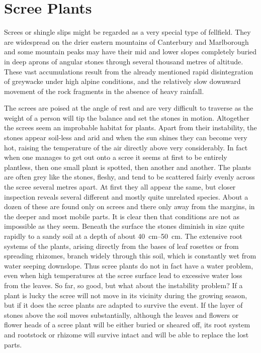 \section{Scree Plants}

Screes or shingle slips might be regarded as a very special type of fellfield.
They are widespread on the drier eastern mountains of Canterbury and Marlborough and some mountain peaks may have their mid and lower slopes completely buried in deep aprons of angular stones through several thousand metres of altitude.
These vast accumulations result from the already mentioned rapid disintegration of greywacke under high alpine conditions, and the relatively slow downward movement of the rock fragments in the absence of heavy rainfall.

The screes are poised at the angle of rest and are very difficult to traverse as the weight of a person will tip the balance and set the stones in motion.
Altogether the screes seem an improbable habitat for plants.
Apart from their instability, the stones appear soil-less and arid and when the sun shines they can become very hot, raising the temperature of the air directly above very considerably.
In fact when one manages to get out onto a scree it seems at first to be entirely plantless, then one small plant is spotted, then another and another.
The plants are often grey like the stones, fleshy, and tend to be scattered fairly evenly across the scree several metres apart.
At first they all appear the same, but closer inspection reveals several different and mostly quite unrelated species.
About a dozen of these are found only on screes and there only away from the margins, in the deeper and most mobile parts.
It is clear then that conditions are not as impossible as they seem.
Beneath the surface the stones diminish in size quite rapidly to a sandy soil at a depth of about \SIrange{40}{50}{\centi\metre}.
The extensive root systems of the plants, arising directly from the bases of leaf rosettes or from spreading rhizomes, branch widely through this soil, which is constantly wet from water seeping downslope.
Thus scree plants do not in fact have a water problem, even when high temperatures at the scree surface lead to excessive water loss from the leaves.
So far, so good, but what about the instability problem? If a plant is lucky the scree will not move in its vicinity during the growing season, but if it does the scree plants are adapted to survive the event.
If the layer of stones above the soil moves substantially, although the leaves and flowers or flower heads of a scree plant will be either buried or sheared off, its root system and rootstock or rhizome will survive intact and will be able to replace the lost parts.
